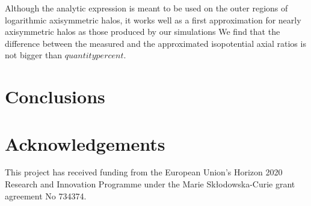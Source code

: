 \documentclass[a4paper,fleqn,usenatbib]{mnras}
\begin{document}
Although the analytic expression is meant to be used on the outer
regions of logarithmic axisymmetric halos, it works well as a first
approximation for nearly axisymmetric halos as those produced by our
simulations 
We find that the difference between the measured and the
approximated isopotential axial ratios is not bigger than $quantity
percent$.


\section{Conclusions}


\section*{Acknowledgements}
This project has received funding from the European Union's Horizon
2020 Research and Innovation Programme under the Marie
Sk\l{}odowska-Curie grant agreement No 734374. 

 
 
\end{document}
